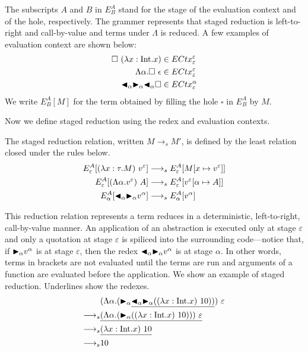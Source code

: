 The subscripts $A$ and $B$ in $E^A_B$ stand for the stage of the evaluation context and of the hole, respectively.  The grammer represents that staged reduction is left-to-right and call-by-value and terms under \(\Lambda\) is reduced.
A few examples of evaluation context are shown below:
\begin{align*}
  \square\ (\lambda x:\textrm{Int}.x)                  & \in  ECtx^\varepsilon_\varepsilon \\
  \Lambda\alpha.\square\ \epsilon            & \in ECtx^\varepsilon_\varepsilon  \\
  {\mathop{\blacktriangleleft}}_\alpha {\mathop{\blacktriangleright}}_\alpha {\mathop{\blacktriangleleft}}_\alpha \square & \in ECtx^\alpha_\varepsilon
\end{align*}
%
We write $E^A_B[M]$ for the term obtained by filling the hole $\square$ in $E^A_B$ by $M$.

Now we define staged reduction using the redex and evaluation contexts.

\begin{definition}
  The staged reduction relation, written $M \longrightarrow_s M'$, is defined by
  the least relation closed under the rules below.
  \begin{align*}
    E^A_\varepsilon [(\lambda x:\tau.M)\ v^\varepsilon] & \longrightarrow_s E^A_\varepsilon[M[x\mapsto v^\varepsilon]]      \\
    E^A_\varepsilon [(\Lambda\alpha.v^\varepsilon)\ A]  & \longrightarrow_s E^A_\varepsilon[v^\varepsilon[\alpha\mapsto A]] \\
    E^A_\alpha [{\mathop{\blacktriangleleft}}_\alpha {\mathop{\blacktriangleright}}_\alpha v^\alpha]        & \longrightarrow_s E^A_\alpha[v^\alpha]                            \\
  \end{align*}
\end{definition}

This reduction relation represents a term reduces in a deterministic,
left-to-right, call-by-value manner.  An application of an abstraction
is executed only at stage \(\varepsilon\) and only a quotation at
stage \(\varepsilon\) is spiliced into the surrounding code---notice
that, if \({\mathop{\blacktriangleright}}_\alpha v^\alpha\) is at stage \(\varepsilon\), then the
redex \({\mathop{\blacktriangleleft}}_\alpha {\mathop{\blacktriangleright}}_\alpha v^\alpha\) is at stage \(\alpha\).
In other words, terms in brackets are not evaluated until the terms are run
and arguments of a function are evaluated before the application.
We show an example of staged reduction.
Underlines show the redexes.
\begin{align*}
                    & (\Lambda\alpha.(\TB_\alpha \underline{\TBL_\alpha \TB_\alpha ((\lambda x:\I.x)\ 10))})\ \varepsilon \\
  \longrightarrow_s & \underline{(\Lambda\alpha.(\TB_\alpha ((\lambda x:\I.x)\ 10)))\ \varepsilon}                        \\
  \longrightarrow_s & \underline{(\lambda x:\I.x)\ 10}                                                                    \\
  \longrightarrow_s & 10
\end{align*}